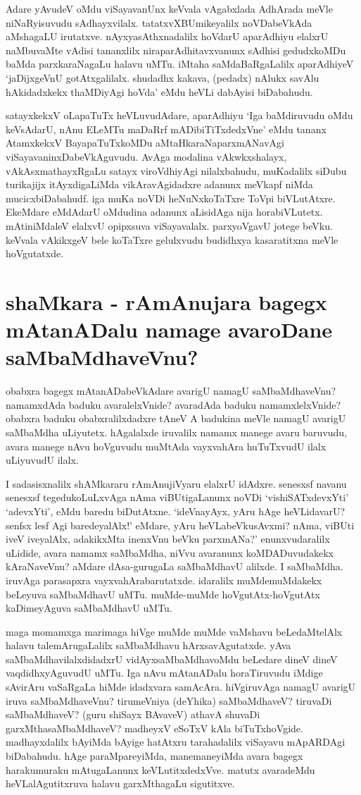 Adare yAvudeV oMdu viSayavanUnx keVvala vAgabxlada AdhArada meVle niNaRyisuvudu sAdhayxvilalx. tatatxvXBUmikeyalilx noVDabeVkAda aMshagaLU irutatxve. nAyxyasAthxnadalilx hoVdarU aparAdhiyu elalxrU naMbuvaMte vAdisi tananxlilx niraparAdhitavxvanunx sAdhisi gedudxkoMDu baMda parxkaraNagaLu halavu uMTu. iMtaha saMdaBaRgaLalilx aparAdhiyeV `jaDijxgeVnU gotAtxgalilalx. shudadhx kakava, (pedadx) nAlukx savAlu hAkidadxkekx thaMDiyAgi hoVda' eMdu heVLi dabAyisi biDabahudu.

satayxkekxV oLapaTuTx heVLuvudAdare, aparAdhiyu `Iga baMdiruvudu oMdu keVsAdarU, nAnu ELeMTu maDaRrf mADibiTiTxdedxVne' eMdu tananx AtamxkekxV BayapaTuTxkoMDu aMtaHkaraNaparxmANavAgi viSayavaninxDabeVkAguvudu. AvAga modalina vAkwkxshalayx, vAkAsxmathayxRgaLu satayx viroVdhiyAgi nilalxbahudu, muKadalilx siDubu turikajijx itAyxdigaLiMda vikAravAgidadxre adanunx meVkapf niMda mucicxbiDabahudf. iga muKa noVDi heNuNxkoTaTxre ToVpi biVLutAtxre. EkeMdare eMdAdarU oMdudina adanunx aLisidAga nija horabiVLutetx. mAtiniMdaleV elalxvU opipxsuva viSayavalalx. parxyoVgavU jotege beVku. keVvala vAkikxgeV bele koTaTxre gelulxvudu budidhxya kasaratitxna meVle hoVgutatxde.

\section*{shaMkara - rAmAnujara bagegx mAtanADalu namage avaroDane saMbaMdhaveVnu?}

obabxra bagegx mAtanADabeVkAdare avarigU namagU saMbaMdhaveVnu? namamxdAda baduku avaralelxVnide? avaradAda baduku namamxlelxVnide? obabxra baduku obabxralilxdadxre tAneV A badukina meVle namagU avarigU saMbaMdha uLiyutetx. hAgalalxde iruvalilx namamx manege avaru baruvudu, avara manege nAvu hoVguvudu muMtAda vayxvahAra huTuTxvudU ilalx uLiyuvudU ilalx.

I sadasisxnalilx shAMkararu rAmAnujiVyaru elalxrU idAdxre. senesxsf navanu senesxsf tegedukoLuLxvAga nAma viBUtigaLanunx noVDi `vishiSATxdevxYti' `adevxYti', eMdu baredu biDutAtxne. `ideVnayAyx, yAru hAge heVLidavarU? senfsx lesf Agi baredeyalAlx!' eMdare, yAru heVLabeVkusAvxmi? nAma, viBUti iveV iveyalAlx, adakikxMta inenxVnu beVku parxmANa?' enunxvudaralilx uLidide, avara namamx saMbaMdha, niVvu avaranunx koMDADuvudakekx  kAraNaveVnu? aMdare dAsa-gurugaLa saMbaMdhavU alilxde. I saMbaMdha. iruvAga parasapxra vayxvahArabarutatxde. idaralilx muMdemuMdakekx beLeyuva saMbaMdhavU uMTu. muMde-muMde hoVgutAtx-hoVgutAtx kaDimeyAguva saMbaMdhavU uMTu.

maga momamxga marimaga hiVge muMde muMde vaMshavu beLedaMtelAlx halavu talemArugaLalilx saMbaMdhavu hArxsavAgutatxde. yAva saMbaMdhavilalxdidadxrU vidAyxsaMbaMdhavoMdu beLedare dineV dineV vaqdidhxyAguvudU uMTu. Iga nAvu mAtanADalu horaTiruvudu iMdige sAvirAru vaSaRgaLa hiMde idadxvara samAcAra. hiVgiruvAga namagU avarigU iruva saMbaMdhaveVnu? tirumeVniya (deYhika) saMbaMdhaveV? tiruvaDi saMbaMdhaveV? (guru shiSayx BAvaveV) athavA shuvaDi garxMthasaMbaMdhaveV? madheyxV eSoTxV kAla biTuTxhoVgide. madhayxdalilx bAyiMda bAyige hatAtxru tarahadalilx viSayavu mApARDAgi biDabahudu. hAge paraMpareyiMda, manemaneyiMda avara bagegx harakumuraku mAtugaLanunx  keVLutitxdedxVve. matutx avaradeMdu heVLalAgutitxruva halavu garxMthagaLu sigutitxve.

